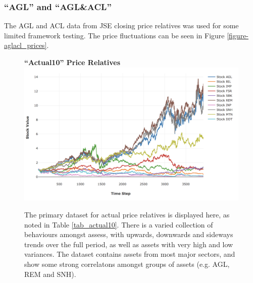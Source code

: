 \documentclass[a4paper,11pt,oneside]{article}
\theoremstyle{plain}
\theoremstyle{definition}
\begin{document}
	\subsubsection{``AGL'' and ``AGL\&ACL''}\label{dataset_agl}\label{dataset_aglacl}
	
	The AGL and ACL data from JSE closing price relatives was used for some limited framework testing. The price fluctuations can be seen in Figure \ref{figure-aglacl_prices}.
	
	\begin{figure}[H]
		\centering
		\textbf{``Actual10'' Price Relatives}
		\includegraphics[scale=0.45]{images/results/prices/actual10_prices.png} 
		\caption[``Actual10'' Price Relatives]{The primary dataset for actual price relatives is displayed here, as noted in Table \ref{tab_actual10}. There is a varied collection of behaviours amongst assess, with upwards, downwards and sideways trends over the full period, as well as assets with very high and low variances. The dataset contains assets from most major sectors, and show some strong correlatons amongst groups of assets (e.g. AGL, REM and SNH). }
		\label{figure-actual10_prices}
	\end{figure}
	
\end{document}

